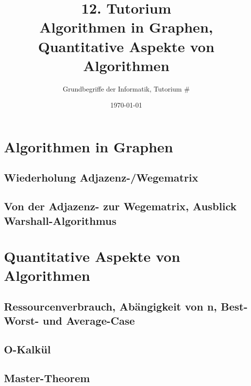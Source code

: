 




\title[Algorithmen in Graphen, Quantitative Aspekte von Algorithmen]{12. Tutorium\\ Algorithmen in Graphen, \\Quantitative Aspekte von Algorithmen}
\subtitle{Grundbegriffe der Informatik, Tutorium \#\mytutnumber}
\date{\today}



\titleframe
\roadmap

\section{Algorithmen in Graphen}
\subsection{Wiederholung Adjazenz-/Wegematrix}

\subsection{Von der Adjazenz- zur Wegematrix, Ausblick Warshall-Algorithmus}



\section{Quantitative Aspekte von Algorithmen}
\newcommand{\Rplus}{\ensuremath{\nR_+}}
\newcommand{\Rnullplus}{\ensuremath{\nR^+_0}}
\subsection{Ressourcenverbrauch, Abängigkeit von n, Best- Worst- und Average-Case}

\subsection{O-Kalkül}

\subsection{Master-Theorem}



